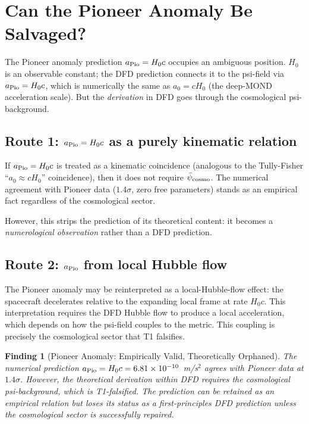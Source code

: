 \documentclass[11pt]{article}
\newtheorem{finding}{Finding}
\newcommand{\ee}[1]{\times 10^{#1}}
\newcommand{\psicosmo}{\bar{\psi}_{\rm cosmo}}
\newcommand{\Hzero}{H_0}
\begin{document}
\section{Can the Pioneer Anomaly Be Salvaged?}
\label{sec:Pioneer}

The Pioneer anomaly prediction $a_{\rm Pio} = \Hzero c$ occupies an ambiguous
position. $\Hzero$ is an observable constant; the DFD prediction connects it
to the psi-field via $a_{\rm Pio} = \Hzero c$, which is numerically the same
as $a_0 = c\Hzero$ (the deep-MOND acceleration scale). But the \emph{derivation}
in DFD goes through the cosmological psi-background.

\subsection{Route 1: $a_{\rm Pio} = \Hzero c$ as a purely kinematic relation}

If $a_{\rm Pio} = \Hzero c$ is treated as a kinematic coincidence (analogous
to the Tully-Fisher ``$a_0 \approx c\Hzero$'' coincidence), then it does
not require $\psicosmo$. The numerical agreement with Pioneer data
($1.4\sigma$, zero free parameters) stands as an empirical fact regardless
of the cosmological sector.

However, this strips the prediction of its theoretical content: it becomes
a \emph{numerological observation} rather than a DFD prediction.

\subsection{Route 2: $a_{\rm Pio}$ from local Hubble flow}

The Pioneer anomaly may be reinterpreted as a local-Hubble-flow effect:
the spacecraft decelerates relative to the expanding local frame at rate
$\Hzero c$. This interpretation requires the DFD Hubble flow to produce a
local acceleration, which depends on how the psi-field couples to the metric.
This coupling is precisely the cosmological sector that T1 falsifies.

\begin{finding}[Pioneer Anomaly: Empirically Valid, Theoretically Orphaned]
\label{find:Pioneer}
The numerical prediction $a_{\rm Pio} = \Hzero c = 6.81\ee{-10}$~m/s$^2$
agrees with Pioneer data at $1.4\sigma$. However, the \emph{theoretical
derivation} within DFD requires the cosmological psi-background, which is
T1-falsified. The prediction can be retained as an empirical relation
but loses its status as a first-principles DFD prediction unless the
cosmological sector is successfully repaired.
\end{finding}
\end{document}
